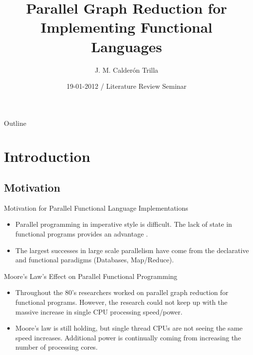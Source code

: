 \documentclass{beamer}
\title[Parallel Graph Reduction] %
{Parallel Graph Reduction for Implementing Functional Languages}
\subtitle
{} %
\author[] %
{J. M. Calder\'{o}n Trilla}
\institute[University of York] %
{%
  Department of Computer Science\\
  PLASMA Research Group \\
  University of York
 }
\date[] %
{19-01-2012 / Literature Review Seminar}
\begin{document}
\begin{frame}
  \titlepage
\end{frame}

\begin{frame}{Outline}
  \tableofcontents
\end{frame}




\section{Introduction}

\subsection[Motivation]{Motivation}

\begin{frame}{Motivation for Parallel Functional Language Implementations}
    \begin{itemize}
        \item
            Parallel programming in imperative style is difficult. The lack of state in
            functional programs provides an advantage \citep{PFPAnIntro}.
\pause
        \item
            The largest successes in large scale parallelism have come from the declarative
            and functional paradigms (Databases, Map/Reduce).
    \end{itemize}
\end{frame}

\begin{frame}{Moore's Law's Effect on Parallel Functional Programming}
    \begin{itemize}
        \item
            Throughout the 80's researchers worked on parallel graph reduction for functional
            programs. However, the research could not keep up with the massive increase
            in single CPU processing speed/power. 
\pause
        \item
            Moore's law is still holding, but single thread CPUs are not seeing the same speed
            increases. Additional power is continually coming from increasing the number of 
            processing cores.
             
    \end{itemize}
\end{frame}
\end{document}
